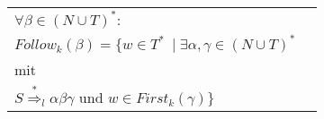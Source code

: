 \documentclass[
    border=0.2cm,
    convert={density=600}
]{standalone}
\begin{document}
	\begin{tabular}{lp{11 cm}}
$\forall \beta \in (N \cup T)^*:$\\

$Follow_k(\beta) = \{w \in T^*\ \mid \exists \alpha, \gamma \in  (N \cup T)^*$\\
mit \\
$S \overset{*}{\Rightarrow}_l \alpha \beta \gamma$ und $w \in First_k(\gamma) \}$

\end{tabular}
\end{document}
